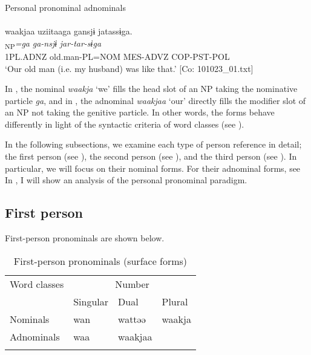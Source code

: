  \ex \label{ex:5:1b} Personal pronominal adnominals\\\\
\glll  waakjaa  uziitaaga  gansjɨ  jatassɨga.\\
[\textit{waakjaa}\textsubscript{Modifier}  \textit{uzii-taa}\textsubscript{Head}]\textsubscript{NP}\textit{=ga}  \textit{ga-nsjɨ}  \textit{jar-tar-sɨga}\\
1PL.ADNZ  old.man-PL=NOM  MES-ADVZ  COP-PST-POL\\
\glt ‘Our old man (i.e. my husband) was like that.’ [Co: 101023\_01.txt]
\z
\z

In , the nominal \textit{waakja} ‘we’ fills the head slot of an NP taking the nominative particle \textit{ga}, and in , the adnominal \textit{waakjaa} ‘our’ directly fills the modifier slot of an NP not taking the genitive particle. In other words, the forms behave differently in light of the syntactic criteria of word classes (see ).

  In the following subsections, we examine each type of person reference in detail; the first person (see ), the second person (see ), and the third person (see ). In particular, we will focus on their nominal forms. For their adnominal forms, see  In , I will show an analysis of the personal pronominal paradigm.

\subsection{First person}

First-person pronominals are shown below.

\begin{table}
\caption{\label{tab:key:33}First-person pronominals (surface forms)}
\begin{tabular}{llll}
\lsptoprule
Word classes  & \multicolumn{3}{c}{Number}\\\cmidrule(lr){2-4}
              &  Singular & Dual & Plural\\\midrule
Nominals & wan & wattəə & waakja\\
Adnominals & waa & waakjaa\\
\lspbottomrule
\end{tabular}
\end{table}

